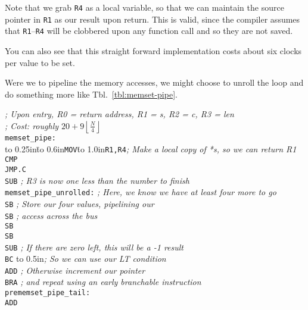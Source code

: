 \documentclass{gqtekspec}
\begin{document}
Note that we grab {\tt R4} as a local variable, so that we can maintain the
source pointer in {\tt R1} as our result upon return.  This is valid, since the
compiler assumes that {\tt R1}--{\tt R4} will be clobbered upon any function
call and so they are not saved.

You can also see that this straight forward implementation costs about
six clocks per value to be set.

Were we to pipeline the memory accesses, we might choose to unroll the loop
and do something more like Tbl.~\ref{tbl:memset-pipe}.
\begin{table}\begin{center}
\begin{tabbing}
{\em ; Upon entry, R0 = return address, R1 = s, R2 = c, R3 = len}\\
{\em ; Cost: roughly $20+9\left\lfloor\frac{N}{4}\right\rfloor$}\\
{\tt memset\_pipe:}\\
\hbox to 0.25in{}\=\hbox to 0.6in{\tt MOV}\=\hbox to 1.0in{\tt R1,R4}\={\em ; Make a local copy of *s, so we can return R1}\\
\>	{\tt CMP}\\
\>	{\tt JMP.C}\\
\>	{\tt SUB}\> {\em ; R3 is now one less than the number to finish}\\
{\tt memset\_pipe\_unrolled:}\>\>\> {\em ; Here, we know we have at least four more to go}\\
\>	{\tt SB} \> {\em  ; Store our four values, pipelining our}\\
\>	{\tt SB} \> {\em ; access across the bus }\\
\>	{\tt SB} \\
\>	{\tt SB} \\
\>	{\tt SUB} \> {\em; If there are zero left, this will be a -1 result}\\
\>	{\tt BC}\> \hbox to 0.5in{}\= {\em; So we can use our LT condition}\\
\>	{\tt ADD} \> {\em ; Otherwise increment our pointer}\\
\>	{\tt BRA} {\em ; and repeat using an early branchable instruction}\\
{\tt prememset\_pipe\_tail:} \\
\>    {\tt ADD}\\

\end{tabbing}
\end{center}
\end{table}
\end{document}
